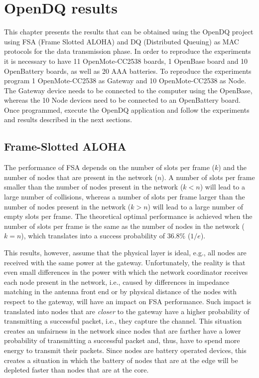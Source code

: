 \chapter{OpenDQ results}
\label{sec:07-results}
This chapter presents the results that can be obtained using the OpenDQ project using FSA (Frame Slotted ALOHA) and DQ (Distributed Queuing) as MAC protocols for the data transmission phase. In order to reproduce the experiments it is necessary to have 11 OpenMote-CC2538 boards, 1 OpenBase board and 10 OpenBattery boards, as well as 20 AAA batteries. To reproduce the experiments program 1 OpenMote-CC2538 as Gateway and 10 OpenMote-CC2538 as Node. The Gateway device needs to be connected to the computer using the OpenBase, whereas the 10 Node devices need to be connected to an OpenBattery board. Once programmed, execute the OpenDQ application and follow the experiments and results described in the next sections.

\section{Frame-Slotted ALOHA}
The performance of FSA depends on the number of slots per frame ($k$) and the number of nodes that are present in the network ($n$). A number of slots per frame smaller than the number of nodes present in the network ($k<n$) will lead to a large number of collisions, whereas a number of slots per frame larger than the number of nodes present in the network ($k>n$) will lead to a large number of empty slots per frame. The theoretical optimal performance is achieved when the number of slots per frame is the same as the number of nodes in the network ($k=n$), which translates into a success probability of $36.8\%$ ($1/e$).

This results, however, assume that the physical layer is ideal, e.g., all nodes are received with the same power at the gateway. Unfortunately, the reality is that even small differences in the power with which the network coordinator receives each node present in the network, i.e., caused by differences in impedance matching in the antenna front end or by physical distance of the nodes with respect to the gateway, will have an impact on FSA performance. Such impact is translated into nodes that are \textit{closer} to the gateway have a higher probability of transmitting a successful packet, i.e., they capture the channel. This situation creates an unfairness in the network since nodes that are farther have a lower probability of transmitting a successful packet and, thus, have to spend more energy to transmit their packets. Since nodes are battery operated devices, this creates a situation in which the battery of nodes that are at the edge will be depleted faster than nodes that are at the core.

